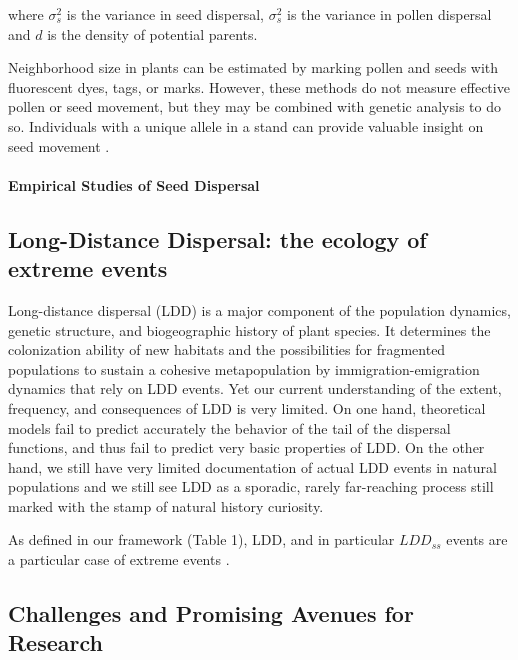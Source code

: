 \documentclass[a4paper, 12pt]{article}
\begin{document}
\begin{linenumbers}
where $\sigma^2_s$ is the variance in seed dispersal, $\sigma^2_s$ is the variance in pollen dispersal and $d$ is the density of potential parents.

Neighborhood size in plants can be estimated by marking pollen and seeds with fluorescent dyes, tags, or  marks. However, these methods do not measure effective pollen or seed movement, but they may be combined with genetic analysis to do so.  Individuals with a unique allele in a stand can provide valuable insight on seed movement \citep{Eguiarte:1993aa}.


\paragraph*{Empirical Studies of Seed Dispersal}

\subsection*{Long-Distance Dispersal: the ecology of extreme events}

Long-distance dispersal (LDD) is a major component of the population dynamics, genetic structure, and biogeographic history of plant species. It determines the colonization ability of new habitats and the possibilities for fragmented populations to sustain a cohesive metapopulation by immigration-emigration dynamics that rely on LDD events. Yet our current understanding of the extent, frequency, and consequences of LDD is very limited. On one hand, theoretical models fail to predict accurately the behavior of the tail of the dispersal functions, and thus fail to predict very basic properties of LDD. On the other hand, we still have very limited documentation of actual LDD events in natural populations and we still see LDD as a sporadic, rarely far-reaching process still marked with the stamp of natural history curiosity.

As defined in our framework (Table 1), LDD, and in particular $LDD_{ss}$ events are a particular case of extreme events \citep{Garcia:2017aa}. 



\subsection*{Challenges and Promising Avenues for Research}






\end{linenumbers}
\end{document}
